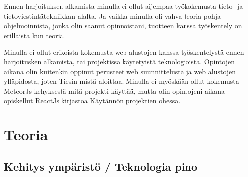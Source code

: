 \documentclass[11pt,a4paper,titlepage,oneside]{article}
\begin{document}
\medskip



Ennen harjoituksen alkamista minulla ei ollut aijempaa työkokemusta tieto- ja tietoviestintätekniikkan alalta.
Ja vaikka minulla oli vahva teoria pohja ohjelmoinnista, jonka olin saanut opinnoistani, 
tuotteen kanssa työskentely on erillaista kun teoria.
\medskip




Minulla ei ollut erikoista kokemusta web alustojen kanssa työskentelystä ennen harjoitusken alkamista, tai 
projektissa käytetyistä teknologioista. 
Opintojen aikana olin kuitenkin oppinut perusteet web suunnittelusta ja web alustojen ylläpidosta, 
joten Tiesin mistä aloittaa.
Minulla ei myöskään ollut kokemusta MeteorJs kehyksestä mitä projekti käyttää, mutta olin opintojeni aikana opiskellut ReactJs kirjastoa
Käytännön projektien ohessa.























\newpage
\section{Teoria}                %



\subsection{Kehitys ympäristö / Teknologia pino}

\end{document}
